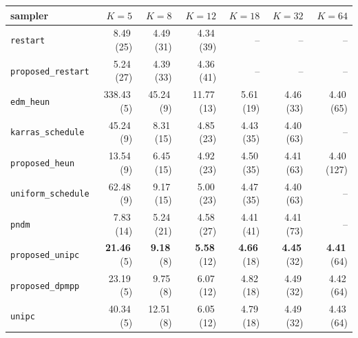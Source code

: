 \documentclass[11pt]{article}
\begin{document}
\begin{center}
\scriptsize
\begin{tabular}{l r r r r r r}
\toprule
sampler & \(K{=}5\) & \(K{=}8\) & \(K{=}12\) & \(K{=}18\) & \(K{=}32\) & \(K{=}64\) \\
\midrule
\texttt{restart}              & 8.49\,\scriptsize(25)   & 4.49\,\scriptsize(31)   & 4.34\,\scriptsize(39)   & --                     & --                      & --                       \\
\texttt{proposed\_restart}    & 5.24\,\scriptsize(27)   & 4.39\,\scriptsize(33)   & 4.36\,\scriptsize(41)   & --                     & --                      & --                       \\
\texttt{edm\_heun}            & 338.43\,\scriptsize(5)  & 45.24\,\scriptsize(9)   & 11.77\,\scriptsize(13)  & 5.61\,\scriptsize(19)  & 4.46\,\scriptsize(33)   & 4.40\,\scriptsize(65)    \\
\texttt{karras\_schedule}     & 45.24\,\scriptsize(9)   & 8.31\,\scriptsize(15)   & 4.85\,\scriptsize(23)   & 4.43\,\scriptsize(35)  & 4.40\,\scriptsize(63)   & --                       \\
\texttt{proposed\_heun}       & 13.54\,\scriptsize(9)   & 6.45\,\scriptsize(15)   & 4.92\,\scriptsize(23)   & 4.50\,\scriptsize(35)  & 4.41\,\scriptsize(63)   & 4.40\,\scriptsize(127)   \\
\texttt{uniform\_schedule}    & 62.48\,\scriptsize(9)   & 9.17\,\scriptsize(15)   & 5.00\,\scriptsize(23)   & 4.47\,\scriptsize(35)  & 4.40\,\scriptsize(63)   & --                       \\
\texttt{pndm}                 & 7.83\,\scriptsize(14)   & 5.24\,\scriptsize(21)   & 4.58\,\scriptsize(27)   & 4.41\,\scriptsize(41)  & 4.41\,\scriptsize(73)   & --                       \\
\texttt{proposed\_unipc}      & \textbf{21.46}\,\scriptsize(5)  & \textbf{9.18}\,\scriptsize(8)  & \textbf{5.58}\,\scriptsize(12)  & \textbf{4.66}\,\scriptsize(18)  & \textbf{4.45}\,\scriptsize(32)  & \textbf{4.41}\,\scriptsize(64)  \\
\texttt{proposed\_dpmpp}      & 23.19\,\scriptsize(5)   & 9.75\,\scriptsize(8)    & 6.07\,\scriptsize(12)   & 4.82\,\scriptsize(18)  & 4.49\,\scriptsize(32)   & 4.42\,\scriptsize(64)    \\
\texttt{unipc}                & 40.34\,\scriptsize(5)   & 12.51\,\scriptsize(8)   & 6.05\,\scriptsize(12)   & 4.79\,\scriptsize(18)  & 4.49\,\scriptsize(32)   & 4.43\,\scriptsize(64)    \\

\end{tabular}
\end{center}
\end{document}
